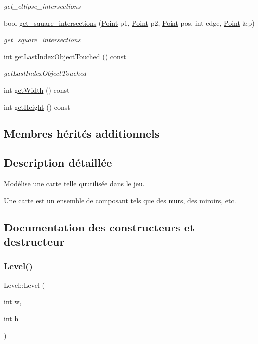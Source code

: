 \begin{DoxyCompactItemize}
\begin{DoxyCompactList}\small\item\em get\+\_\+ellipse\+\_\+intersections \end{DoxyCompactList}\item 
bool \mbox{\hyperlink{class_level_ab8ca40a9dd500c2d46d557e937f08843}{get\+\_\+square\+\_\+intersections}} (\mbox{\hyperlink{class_point}{Point}} p1, \mbox{\hyperlink{class_point}{Point}} p2, \mbox{\hyperlink{class_point}{Point}} pos, int edge, \mbox{\hyperlink{class_point}{Point}} \&p)
\begin{DoxyCompactList}\small\item\em get\+\_\+square\+\_\+intersections \end{DoxyCompactList}\item 
int \mbox{\hyperlink{class_level_ad26edebecbd623c348154eaf5e51cbb1}{get\+Last\+Index\+Object\+Touched}} () const
\begin{DoxyCompactList}\small\item\em get\+Last\+Index\+Object\+Touched \end{DoxyCompactList}\item 
int \mbox{\hyperlink{class_level_a7195ddd0c73216532169a1f013513cda}{get\+Width}} () const
\item 
int \mbox{\hyperlink{class_level_a2bc17614afdfca9a7c7ea5771a70426a}{get\+Height}} () const
\end{DoxyCompactItemize}
\subsection*{Membres hérités additionnels}


\subsection{Description détaillée}
Modélise une carte telle qu\textquotesingle{}utilisée dans le jeu. 

Une carte est un ensemble de composant tels que des murs, des miroirs, etc. 

\subsection{Documentation des constructeurs et destructeur}
\mbox{\label{class_level_a0350f00c8b282de634af2c09ec040bb8}} 
\subsubsection{\texorpdfstring{Level()}{Level()}}
{\footnotesize\ttfamily Level\+::\+Level (\begin{DoxyParamCaption}\item[{int}]{w,  }\item[{int}]{h }\end{DoxyParamCaption})}

